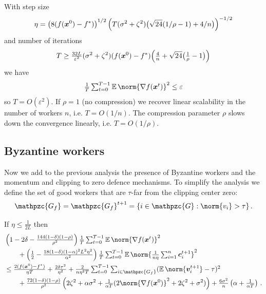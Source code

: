 \documentclass{article}
\newcommand{\gset}{\ensuremath{{\mathpzc{G}}}}
\newcommand{\gfset}{\ensuremath{{\mathpzc{G_f}}}}
\begin{document}
\begin{corollary}\label{cor:efsgd-convergence-rate}
  With step size 
  \[
  	\eta = \left(8(f(\bm{x}^0) - f^\ast)\right)^{1/2} \left(T  (\sigma^2+\zeta^2) \bigl(\sqrt{24} (1/\rho - 1) + 4 / n\bigr)\right)^{-1/2}
  \]
  and number of iterations 
  \[
    T \geq \tfrac{32 L}{\varepsilon^2} (\sigma^2+\zeta^2) (f(\bm{x}^0) - f^\ast) \Bigl(\tfrac{4}{n} + \sqrt{24} \bigl(\tfrac{1}{\rho} - 1\bigr)\Bigr)
  \]
  we have
  \[
    \tfrac{1}{T} \tsum_{t=0}^{T-1} \E \norm{\nabla f(\xx^t)}^2 \leq \varepsilon
  \]
  so $T = O(\varepsilon^2)$. If $\rho = 1$ (no compression) we recover linear scalability in the number of workers $n$, i.e. $T = O(1/n)$. The compression parameter $\rho$ slows down the convergence linearly, i.e. $T = O(1/\rho)$.
\end{corollary}



\subsection{Byzantine workers}


Now we add to the previous analysis the presence of Byzantine workers and the momentum and clipping to zero defence mechanisms. To simplify the analysis we define the set of good workers that are $\tau$-far from the clipping center zero:
  \[
    \gfset = \gfset^{t+1} = \{i \in \gset : \norm{v_i} > \tau \} \, .
  \]

\begin{lemma}\label{lem:convergence-byz}
  If $\eta \le \tfrac{1}{2L}$ then
  \begin{align*}
    & \left(1 - 2 \delta - \tfrac{144(1-\delta)(1-\rho)}{\rho^2} \right) \tfrac{1}{T} \tsum_{t=0}^{T-1} \E \norm{\nabla f(\xx^t)}^2 
    \\
     & \qquad + 
    \left( \tfrac{1}{2} - \tfrac{18(1-\delta)(1-\alpha)^2 L^2 \eta^2}{\alpha^2} \right) \tfrac{1}{T} \tsum_{t=0}^{T-1} \E \norm{\tfrac{1}{n \eta}\tsum_{i=1}^n \cc_i^{t+1}}^2
    \\
     & \le  
    \tfrac{2(f(\xx^0) - f^\ast)}{\eta T}
     + 
    \tfrac{2\delta\tau^2}{\eta^2}
     + 
    \tfrac{2}{n \eta^2 T} \tsum_{t=0}^{T-1} \tsum_{i\in\gfset} (\E \norm{ \vv_i^{t+1} } - \tau)^2 
    \\
     & \qquad + 
    \tfrac{72(1-\delta)(1-\rho)}{\rho^2} 
      \left(      
          2  \zeta^2
        + \alpha\sigma^2                                             
        + \tfrac{1}{\alpha T}(2\norm{\nabla f(\xx^0) }^2
        + 2 \zeta^2
        + \sigma^2)
      \right)
     +
    \tfrac{6\sigma^2}{n} \left(\alpha + \tfrac{1}{\alpha T}\right) \, .
  \end{align*}
\end{lemma}
\end{document}
